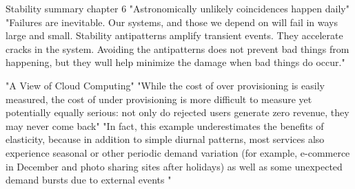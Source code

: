 {Stability summary chapter 6 \cite[p. 117]{nygard2007release}
"Astronomically unlikely coincidences happen daily"
"Failures are inevitable. Our systems, and those we depend on will fail in ways large and small. Stability antipatterns amplify transient events. They accelerate cracks in the system. Avoiding the antipatterns does not prevent bad things from happening, but they wull help minimize the damage when bad things do occur."


"A View of Cloud Computing"
"While the cost of over provisioning is easily measured, the cost of under provisioning is more difficult to measure yet potentially equally serious: not only do rejected users generate zero revenue, they may never come back"
"In fact, this example underestimates the benefits of elasticity, because in addition to simple diurnal patterns, most services also experience seasonal or other periodic demand variation (for example, e-commerce in December and photo sharing sites after holidays) as well as some unexpected demand bursts due to external events "
}





\newpage
